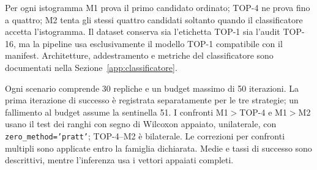 \begin{onehalfspace}
Per ogni istogramma M1 prova il primo candidato ordinato; TOP-4 ne prova
fino a quattro; M2 tenta gli stessi quattro candidati soltanto quando il
classificatore accetta l'istogramma. Il dataset conserva sia l'etichetta
TOP-1 sia l'audit TOP-16, ma la pipeline usa esclusivamente il modello
TOP-1 compatibile con il manifest. Architetture, addestramento e metriche
del classificatore sono documentati nella Sezione~\ref{app:classificatore}.

Ogni scenario comprende 30 repliche e un budget massimo di 50 iterazioni.
La prima iterazione di successo è registrata separatamente per le tre
strategie; un fallimento al budget assume la sentinella 51. I confronti
M1$>$TOP-4 e M1$>$M2 usano il test dei ranghi con segno di Wilcoxon
appaiato, unilaterale, con \texttt{zero\_method='pratt'}; TOP-4--M2 è
bilaterale. Le correzioni per confronti multipli sono applicate entro la
famiglia dichiarata. Medie e tassi di successo sono descrittivi, mentre
l'inferenza usa i vettori appaiati completi.

\end{onehalfspace}
